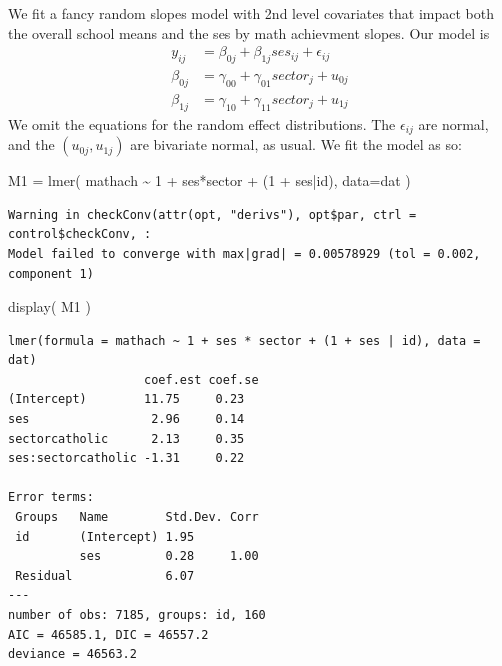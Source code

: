 \documentclass[
  letterpaper,
  DIV=11,
  numbers=noendperiod]{scrreprt}
\newenvironment{Shaded}{\begin{snugshade}}{\end{snugshade}}
\newcommand{\AttributeTok}[1]{\textcolor[rgb]{0.49,0.56,0.16}{#1}}
\newcommand{\DecValTok}[1]{\textcolor[rgb]{0.25,0.63,0.44}{#1}}
\newcommand{\FunctionTok}[1]{\textcolor[rgb]{0.02,0.16,0.49}{#1}}
\newcommand{\NormalTok}[1]{\textcolor[rgb]{0.00,0.44,0.13}{#1}}
\newcommand{\OtherTok}[1]{\textcolor[rgb]{0.00,0.44,0.13}{#1}}
\newcommand{\SpecialCharTok}[1]{\textcolor[rgb]{0.25,0.44,0.63}{#1}}
\begin{document}
We fit a fancy random slopes model with 2nd level covariates that impact
both the overall school means and the ses by math achievment slopes. Our
model is \[
\begin{aligned}
y_{ij} &= \beta_{0j} + \beta_{1j} ses_{ij} +  \epsilon_{ij} \\
\beta_{0j} &= \gamma_{00} + \gamma_{01} sector_j + u_{0j} \\
\beta_{1j} &= \gamma_{10} + \gamma_{11} sector_j + u_{1j} 
\end{aligned}
\] We omit the equations for the random effect distributions. The
\(\epsilon_{ij}\) are normal, and the \((u_{0j},u_{1j})\) are bivariate
normal, as usual. We fit the model as so:

\begin{Shaded}
\begin{Highlighting}[]
\NormalTok{M1 }\OtherTok{=} \FunctionTok{lmer}\NormalTok{( mathach }\SpecialCharTok{\textasciitilde{}} \DecValTok{1} \SpecialCharTok{+}\NormalTok{ ses}\SpecialCharTok{*}\NormalTok{sector }\SpecialCharTok{+}\NormalTok{ (}\DecValTok{1} \SpecialCharTok{+}\NormalTok{ ses}\SpecialCharTok{|}\NormalTok{id), }\AttributeTok{data=}\NormalTok{dat )}
\end{Highlighting}
\end{Shaded}

\begin{verbatim}
Warning in checkConv(attr(opt, "derivs"), opt$par, ctrl = control$checkConv, :
Model failed to converge with max|grad| = 0.00578929 (tol = 0.002, component 1)
\end{verbatim}

\begin{Shaded}
\begin{Highlighting}[]
\FunctionTok{display}\NormalTok{( M1 )}
\end{Highlighting}
\end{Shaded}

\begin{verbatim}
lmer(formula = mathach ~ 1 + ses * sector + (1 + ses | id), data = dat)
                   coef.est coef.se
(Intercept)        11.75     0.23  
ses                 2.96     0.14  
sectorcatholic      2.13     0.35  
ses:sectorcatholic -1.31     0.22  

Error terms:
 Groups   Name        Std.Dev. Corr 
 id       (Intercept) 1.95          
          ses         0.28     1.00 
 Residual             6.07          
---
number of obs: 7185, groups: id, 160
AIC = 46585.1, DIC = 46557.2
deviance = 46563.2 
\end{verbatim}
\end{document}
